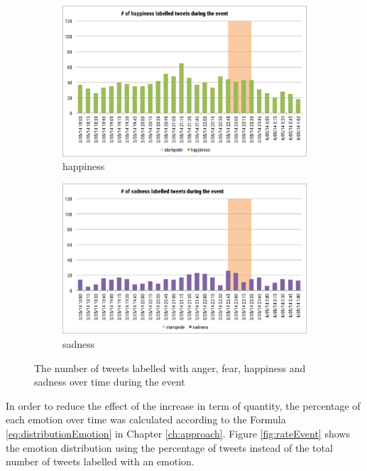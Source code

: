 \begin{figure}[htb!]
\begin{subfigure}{0.5\textwidth}
\centering    
\includegraphics[width=0.99\linewidth]{HappinessInstanceEvent}
\caption{happiness}
\label{fig:happinessInstanceEvent}
\end{subfigure}%
\begin{subfigure}{0.5\textwidth}
\centering    
\includegraphics[width=0.99\linewidth]{SadnessInstanceEvent}
\caption{sadness}
\label{fig:sadnessInstanceEvent}
\end{subfigure}
\caption{The number of tweets labelled with anger, fear, happiness and sadness over time during the event}
\label{fig:instanceEvent}
\end{figure}

In order to reduce the effect of the increase in term of quantity, the percentage of each emotion over time was calculated according to the Formula \ref{eq:distributionEmotion} in Chapter \ref{ch:approach}. Figure \ref{fig:rateEvent} shows the emotion distribution using the percentage of tweets instead of the total number of tweets labelled with an emotion.

